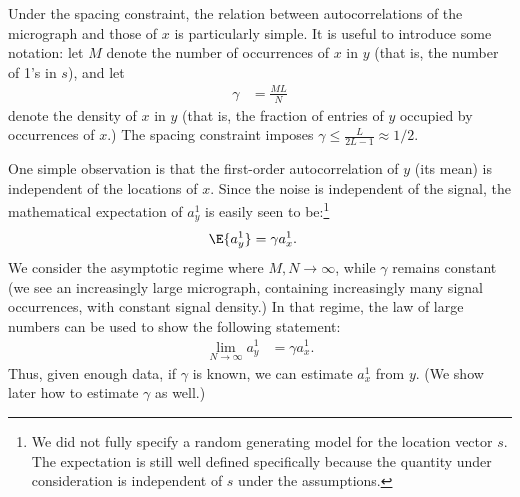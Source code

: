 \documentclass[9pt,twocolumn,twoside,lineno]{pnas-new}
\begin{document}
Under the spacing constraint, the relation between autocorrelations of the micrograph and those of $x$ is particularly simple. It is useful to introduce some notation: let $M$ denote the number of occurrences of $x$ in $y$ (that is, the number of 1's in $s$), and let
\begin{align}
\gamma & = \frac{M L}{N}
\end{align}
denote the density of $x$ in $y$ (that is, the fraction of entries of $y$ occupied by occurrences of $x$.) The spacing constraint%
imposes $\gamma\leq\frac{L}{2L-1}\approx 1/2$.

One simple observation is that the first-order autocorrelation of $y$ (its mean) is independent of the locations of $x$. Since the noise is independent of the signal, the mathematical expectation of $a_y^1$ is easily seen to be:\footnote{We did not fully specify a random generating model for the location vector $s$. The expectation is still well defined specifically because the quantity under consideration is independent of $s$ under the assumptions.}
\begin{align*}
\E\{ a_y^1 \} & = \gamma a_x^1.
\end{align*}
We consider the asymptotic regime where $M, N\to\infty$, while $\gamma$ remains constant (we see an increasingly large micrograph, containing increasingly many signal occurrences, with constant signal density.) In that regime, the law of large numbers can be used to show the following statement:
\begin{align} \label{eq:mean_micrograph}
\lim_{N\to\infty} a_y^1 & = \gamma a_{x}^1.
\end{align}
Thus, given enough data, if $\gamma$ is known, we can estimate $a_x^1$ from $y$. (We show later how to estimate $\gamma$ as well.)
\end{document}
